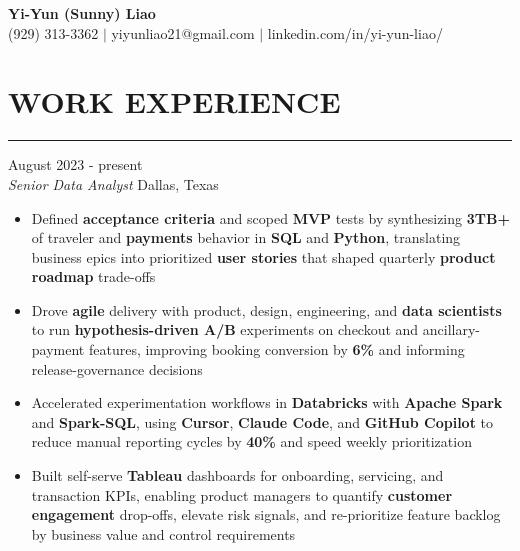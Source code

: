 \documentclass[11pt,letterpaper]{article}
\begin{document}
\begin{center}
  {\Large\textbf{Yi-Yun (Sunny) Liao}}\\[-2pt]
  (929) 313-3362 $|$ yiyunliao21@gmail.com $|$ linkedin.com/in/yi-yun-liao/
\end{center}

\vspace{-2pt}
\section*{WORK EXPERIENCE}
\vspace{-6pt}\noindent\rule{\textwidth}{0.8pt}

\vspace{2pt}
 \hfill August 2023 - present\\[-1pt]
\textit{Senior Data Analyst} \hfill Dallas, Texas
\begin{itemize}[leftmargin=1.5em, rightmargin=0pt, itemsep=-1pt, topsep=-1pt, parsep=0pt]
  \item \justifying Defined \textbf{acceptance criteria} and scoped \textbf{MVP} tests by synthesizing \textbf{3TB+} of traveler and \textbf{payments} behavior in \textbf{SQL} and \textbf{Python}, translating business epics into prioritized \textbf{user stories} that shaped quarterly \textbf{product roadmap} trade-offs
  \item \justifying Drove \textbf{agile} delivery with product, design, engineering, and \textbf{data scientists} to run \textbf{hypothesis-driven A/B} experiments on checkout and ancillary-payment features, improving booking conversion by \textbf{6\%} and informing release-governance decisions
  \item \justifying Accelerated experimentation workflows in \textbf{Databricks} with \textbf{Apache Spark} and \textbf{Spark-SQL}, using \textbf{Cursor}, \textbf{Claude Code}, and \textbf{GitHub Copilot} to reduce manual reporting cycles by \textbf{40\%} and speed weekly prioritization
  \item \justifying Built self-serve \textbf{Tableau} dashboards for onboarding, servicing, and transaction KPIs, enabling product managers to quantify \textbf{customer engagement} drop-offs, elevate risk signals, and re-prioritize feature backlog by business value and control requirements
\end{itemize}
\end{document}
